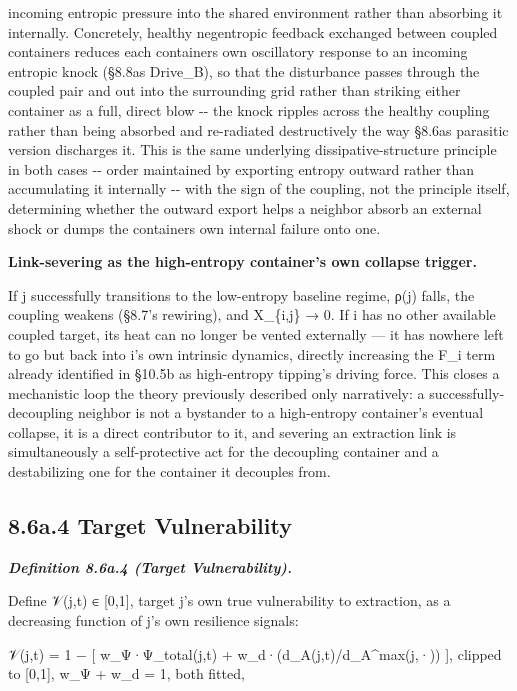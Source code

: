 \documentclass[
]{article}
\begin{document}
incoming entropic pressure into the shared environment rather than
absorbing it internally. Concretely, healthy negentropic feedback
exchanged between coupled containers reduces each
container\textquotesingle s own oscillatory response to an incoming
entropic knock (§8.8a\textquotesingle s Drive\_B), so that the
disturbance passes through the coupled pair and out into the surrounding
grid rather than striking either container as a full, direct blow -\/-
the knock ripples across the healthy coupling rather than being absorbed
and re-radiated destructively the way §8.6a\textquotesingle s parasitic
version discharges it. This is the same underlying dissipative-structure
principle in both cases -\/- order maintained by exporting entropy
outward rather than accumulating it internally -\/- with the sign of the
coupling, not the principle itself, determining whether the outward
export helps a neighbor absorb an external shock or dumps the
container\textquotesingle s own internal failure onto one.

\textbf{Link-severing as the high-entropy container's own collapse
trigger.}

If j successfully transitions to the low-entropy baseline regime, ρ(j)
falls, the coupling weakens (§8.7's rewiring), and X\_\{i,j\} → 0. If i
has no other available coupled target, its heat can no longer be vented
externally --- it has nowhere left to go but back into i's own intrinsic
dynamics, directly increasing the F\_i term already identified in §10.5b
as high-entropy tipping's driving force. This closes a mechanistic loop
the theory previously described only narratively: a
successfully-decoupling neighbor is not a bystander to a high-entropy
container's eventual collapse, it is a direct contributor to it, and
severing an extraction link is simultaneously a self-protective act for
the decoupling container and a destabilizing one for the container it
decouples from.

\hypertarget{a.4-target-vulnerability}{%
\subsection{8.6a.4 Target
Vulnerability}\label{a.4-target-vulnerability}}

\emph{\textbf{Definition 8.6a.4 (Target Vulnerability).}}

Define 𝒱(j,t) ∈ {[}0,1{]}, target j's own true vulnerability to
extraction, as a decreasing function of j's own resilience signals:

𝒱(j,t) = 1 − {[} w\_Ψ·Ψ\_total(j,t) + w\_d·(d\_A(j,t)/d\_A\^{}max(j,·))
{]}, clipped to {[}0,1{]}, w\_Ψ + w\_d = 1, both fitted,
\end{document}
